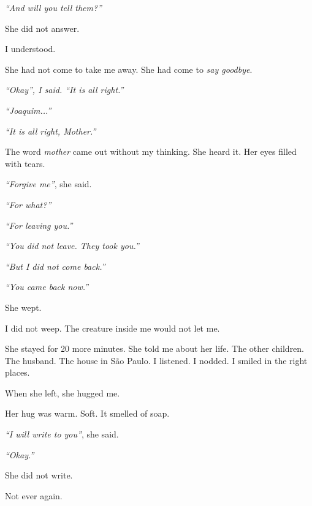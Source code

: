 \noindent \textit{\textquotedblleft{}And will you tell them?\textquotedblright{}}

\noindent She did not answer.

\noindent I understood.

\noindent She had not come to take me away.
She had come to \textit{say goodbye}.

\noindent \textit{\textquotedblleft{}Okay\textquotedblright{}\textit{, I said. }\textquotedblleft{}It is all right.\textquotedblright{}}

\noindent \textit{\textquotedblleft{}Joaquim...\textquotedblright{}}

\noindent \textit{\textquotedblleft{}It is all right, Mother.\textquotedblright{}}

\noindent The word \textit{mother} came out without my thinking. She heard it. Her eyes filled with tears.

\noindent \textit{\textquotedblleft{}Forgive me\textquotedblright{}}, she said.

\noindent \textit{\textquotedblleft{}For what?\textquotedblright{}}

\noindent \textit{\textquotedblleft{}For leaving you.\textquotedblright{}}

\noindent \textit{\textquotedblleft{}You did not leave. They took you.\textquotedblright{}}

\noindent \textit{\textquotedblleft{}But I did not come back.\textquotedblright{}}

\noindent \textit{\textquotedblleft{}You came back now.\textquotedblright{}}

\noindent She wept.

\noindent I did not weep. The creature inside me would not let me.

\noindent She stayed for 20 more minutes. She told me about her life. The other children. The husband. The house in São Paulo. I listened. I nodded. I smiled in the right places.

\noindent When she left, she hugged me.

\noindent Her hug was warm. Soft. It smelled of soap.

\noindent \textit{\textquotedblleft{}I will write to you\textquotedblright{}}, she said.

\noindent \textit{\textquotedblleft{}Okay.\textquotedblright{}}

\noindent She did not write.

\noindent Not ever again.

